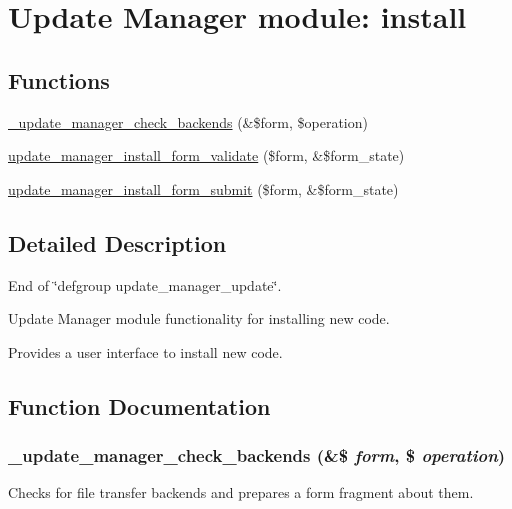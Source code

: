 \hypertarget{group__update__manager__install}{
\section{Update Manager module: install}
\label{group__update__manager__install}
}
\subsection*{Functions}
\begin{DoxyCompactItemize}
\item 
\hyperlink{group__update__manager__install_gad9962bc5fd3a9c0eb86cb469d247d7dc}{\_\-update\_\-manager\_\-check\_\-backends} (\&\$form, \$operation)
\item 
\hyperlink{group__update__manager__install_ga56ab9860e1bc481b261a24c6ef480f75}{update\_\-manager\_\-install\_\-form\_\-validate} (\$form, \&\$form\_\-state)
\item 
\hyperlink{group__update__manager__install_ga52e9f2cddddddccf921284b01f9505b0}{update\_\-manager\_\-install\_\-form\_\-submit} (\$form, \&\$form\_\-state)
\end{DoxyCompactItemize}


\subsection{Detailed Description}
End of \char`\"{}defgroup update\_\-manager\_\-update\char`\"{}.

Update Manager module functionality for installing new code.

Provides a user interface to install new code. 

\subsection{Function Documentation}
\hypertarget{group__update__manager__install_gad9962bc5fd3a9c0eb86cb469d247d7dc}{
\subsubsection[{\_\-update\_\-manager\_\-check\_\-backends}]{\setlength{\rightskip}{0pt plus 5cm}\_\-update\_\-manager\_\-check\_\-backends (\&\$ {\em form}, \/  \$ {\em operation})}}
\label{group__update__manager__install_gad9962bc5fd3a9c0eb86cb469d247d7dc}
Checks for file transfer backends and prepares a form fragment about them.


